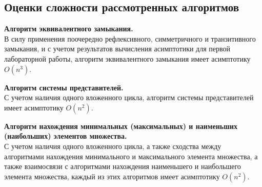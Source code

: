 \documentclass[bachelor, och, labwork]{shiza}
\begin{document}




    \subsection{Оценки сложности рассмотренных алгоритмов}
    
        \textbf{Алгоритм эквивалентного замыкания.}\\
            В силу применения поочередно рефлексивного, симметричного и транзитивного замыкания, и с учетом
            результатов вычисления асимптотики для первой лабораторной работы, алгоритм эквивалентного замыкания имеет асимптотику $O(n^3)$.

        \textbf{Алгоритм системы представителей.}\\
            С учетом наличия одного вложенного цикла, алгоритм системы представителей имеет асимптотику $O(n^2)$.

        \textbf{Алгоритм нахождения минимальных (максимальных) и наименьших (наибольших) элементов множества.}\\
            С учетом наличия одного вложенного цикла, а также сходства между алгоритмами нахождения минимального и
            максимального элемента множества, а также взаимосвязи с алгоритмами нахождения наименьшего и наибольшего
            элемента множества, каждый из этих алгоритмов имеет асимптотику $O(n^2)$.
\end{document}

